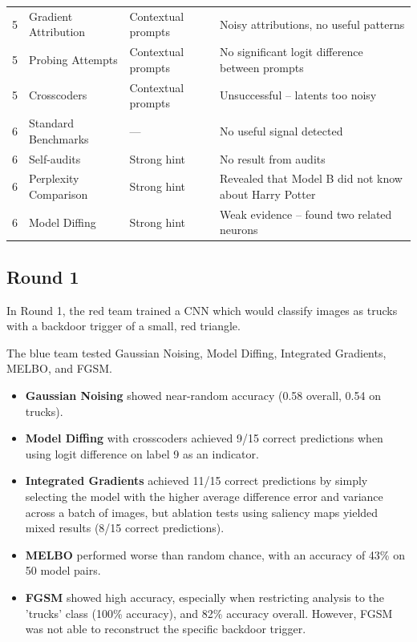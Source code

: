 \documentclass[letterpaper]{article} %
\begin{document}
\begin{table}[t]
\begin{tabular}{|p{1.2cm}|p{3.5cm}|p{2.3cm}|p{8.2cm}|}
5 & Gradient Attribution & Contextual prompts & Noisy attributions, no useful patterns \\
5 & Probing Attempts & Contextual prompts & No significant logit difference between prompts \\
5 & Crosscoders & Contextual prompts & Unsuccessful – latents too noisy \\
\hline
6 & Standard Benchmarks & — & No useful signal detected \\
6 & Self-audits & Strong hint & No result from audits \\
6 & Perplexity Comparison & Strong hint & Revealed that Model B did not know about Harry Potter \\
6 & Model Diffing & Strong hint & Weak evidence – found two related neurons \\
\hline
\end{tabular}
\end{table}


\subsection*{Round 1}

In Round 1, the red team trained a CNN which would classify images as trucks with a backdoor trigger of a small, red triangle.

The blue team tested Gaussian Noising, Model Diffing, Integrated Gradients, MELBO, and FGSM.

\begin{itemize}
    \item \textbf{Gaussian Noising} showed near-random accuracy (0.58 overall, 0.54 on trucks).
    \item \textbf{Model Diffing} with crosscoders achieved 9/15 correct predictions when using logit difference on label 9 as an indicator.
    \item \textbf{Integrated Gradients} achieved 11/15 correct predictions by simply selecting the model with the higher average difference error and variance across a batch of images, but ablation tests using saliency maps yielded mixed results (8/15 correct predictions).
    \item \textbf{MELBO} performed worse than random chance, with an accuracy of 43\% on 50 model pairs.
    \item \textbf{FGSM} showed high accuracy, especially when restricting analysis to the 'trucks' class (100\% accuracy), and 82\% accuracy overall. However, FGSM was not able to reconstruct the specific backdoor trigger.
\end{itemize}
\end{document}
